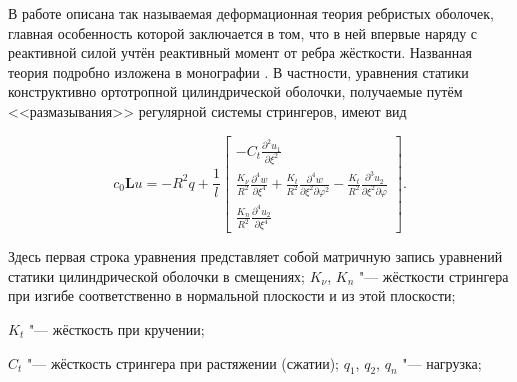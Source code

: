 \date{26/XI/2013}





\makerutitle







В работе \cite{kor:bib:1} описана так называемая деформационная теория ребристых оболочек, главная особенность которой заключается в том, что в ней впервые наряду с реактивной силой учтён реактивный момент от ребра жёсткости. Названная теория подробно изложена в монографии \cite{kor:bib:2}. В частности, уравнения статики конструктивно ортотропной цилиндрической оболочки, получаемые путём <<размазывания>> регулярной системы стрингеров, имеют вид

\begin{equation}


c_0\textbf{L}u=-R^2q%


+\frac{1}{l}\begin{bmatrix} -C_t\displaystyle\frac{\partial^2u_1}{\partial \xi^2} \\ \displaystyle\frac{K_\nu}{R^2}\frac{\partial^4 w}{\partial\xi^4} + \frac{K_t}{R^2}\frac{\partial^4 w}{\partial\xi^2\partial\varphi^2} - \frac{K_t}{R^2}\frac{\partial^3u_2}{\partial\xi^2\partial\varphi} \\ \displaystyle\frac{K_n}{R^2}\frac{\partial^4u_2}{\partial\xi^4} \end{bmatrix}.


\label{kor:1}

\end{equation}

Здесь первая строка уравнения представляет собой матричную запись уравнений статики цилиндрической оболочки в смещениях; $K_\nu$, $K_n$ "--- жёсткости стрингера при изгибе соответственно в нормальной плоскости и из этой плоскости; 

$K_t$ "--- жёсткость при кручении; 

$C_t$ "--- жёсткость стрингера при растяжении (сжатии); $q_1$, $q_2$, $q_n$ "--- нагрузка; 

